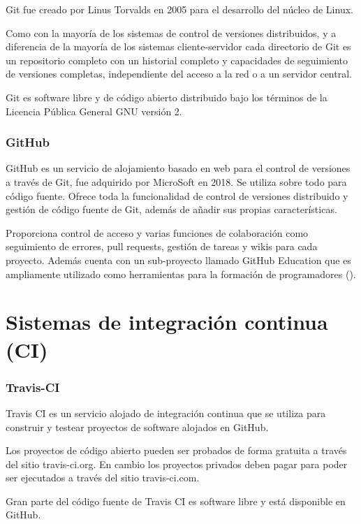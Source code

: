 Git fue creado por Linus Torvalds en 2005 para el desarrollo del núcleo de Linux.

Como con la mayoría de los sistemas de control de versiones distribuidos, y a diferencia de la mayoría de los sistemas cliente-servidor cada directorio de Git es un repositorio completo con un historial completo y capacidades de seguimiento de versiones completas, independiente del acceso a la red o a un servidor central.

Git es software libre y de código abierto distribuido bajo los términos de la Licencia Pública General GNU versión 2.

\subsubsection {GitHub}

GitHub es un servicio de alojamiento basado en web para el control de versiones a través de Git, fue adquirido por MicroSoft en 2018. Se utiliza sobre todo para código fuente. Ofrece toda la funcionalidad de control de versiones distribuido y gestión de código fuente de Git, además de añadir sus propias características.

Proporciona control de acceso y varias funciones de colaboración como seguimiento de errores, pull requests, gestión de tareas y wikis para cada proyecto. Además cuenta con un sub-proyecto llamado GitHub Education que es ampliamente utilizado como herramientas para la formación de programadores (\cite{hernandez_integracion_2018}).


\section {Sistemas de integración continua (CI)}

\subsubsection {Travis-CI}

Travis CI es un servicio alojado de integración continua que se utiliza para construir y testear proyectos de software alojados en GitHub.

Los proyectos de código abierto pueden ser probados de forma gratuita a través del sitio travis-ci.org. En cambio los proyectos privados deben pagar para poder ser ejecutados a través del sitio travis-ci.com.

Gran parte del código fuente de Travis CI es software libre y está disponible en GitHub.

